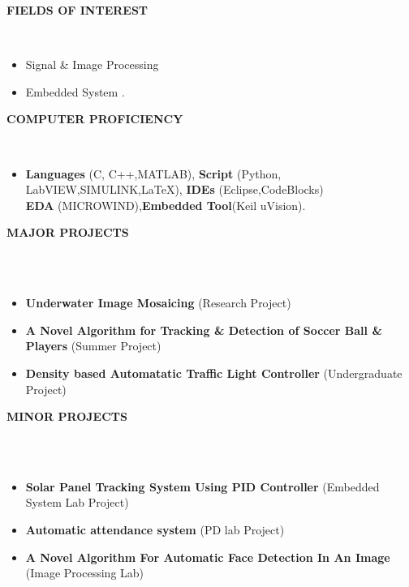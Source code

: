 \documentclass[a4paper,10pt]{article}
\newcommand{\lsep}{-0.5cm}
\newcommand{\resheading}[1]{{\small \colorbox{mygrey}{\begin{minipage}{0.975\textwidth}{\textbf{#1 \vphantom{p\^{E}}}}\end{minipage}}}}
\begin{document}
\resheading{\textbf{FIELDS OF INTEREST} }\\[\lsep]
\begin{itemize}
\item \noindent Signal \& Image Processing
\item\noindent Embedded System .
\end{itemize}

\resheading{\textbf{COMPUTER PROFICIENCY} }\\[\lsep]
\begin{itemize}
\item \noindent \textbf{Languages} (C, C++,MATLAB),
\textbf{Script} (Python, LabVIEW,SIMULINK,\LaTeX), \textbf{IDEs}
(Eclipse,CodeBlocks)\\[0.3cm] \textbf{EDA} (MICROWIND),\textbf{Embedded Tool}(Keil
uVision).
\end{itemize}

\resheading{\textbf{MAJOR PROJECTS} }\\[\lsep]\\[0.1cm]
\begin{itemize}
\item \textbf{Underwater Image Mosaicing
} (Research Project) \\[-0.3cm]
\item \textbf{A Novel Algorithm for Tracking \& Detection of Soccer
	Ball \& Players
} (Summer Project) \\[-0.3cm]
 

\item \textbf{Density based Automatatic Traffic Light Controller
} (Undergraduate Project) \\[-0.3cm]
  
	\end{itemize}
	
\resheading{\textbf{MINOR PROJECTS} }\\[\lsep]\\[0.1cm]
\begin{itemize}
\item \textbf{Solar Panel Tracking System Using PID Controller
} (Embedded System Lab Project) \\[-0.3cm]
\item \textbf{Automatic attendance system
} (PD lab Project) \\[-0.3cm]
\item \textbf{A Novel Algorithm For Automatic Face Detection In An Image 
 }(Image Processing Lab)\\[-0.3cm]
 \end{itemize}
 
\end{document}

